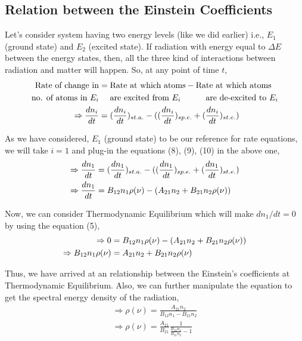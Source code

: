\documentclass[12pt]{article}
\begin{document}
\subsection{Relation between the Einstein Coefficients}

Let's consider system having two energy levels (like we did earlier) i.e., $E_{1}$ (ground state) and $E_{2}$ (excited state). If radiation with energy equal to $\Delta E$ between the energy states, then, all the three kind of interactions between radiation and matter will happen. So, at any point of time $t$,
\begin{align}
    \text{Rate of change in} & = \text{Rate at which atoms} - \text{Rate at which atoms} \notag \\
    \text{no. of atoms in } E_{i} & \quad \text{ are excited from } E_{i} \quad \qquad \text{are de-excited to } E_{i} \notag \\
    \Rightarrow \frac{dn_{i}}{dt} & = (\frac{dn_{i}}{dt})_{st.a.} - ((\frac{dn_{i}}{dt})_{sp.e.} + (\frac{dn_{i}}{dt})_{st.e.}) \notag
\end{align}

As we have considered, $E_{1}$ (ground state) to be our reference for rate equations, we will take $i = 1$ and plug-in the equations (8), (9), (10) in the above one,
\begin{align}
    \Rightarrow \frac{dn_{1}}{dt} & = (\frac{dn_{1}}{dt})_{st.a.} - ((\frac{dn_{1}}{dt})_{sp.e.} + (\frac{dn_{1}}{dt})_{st.e.}) \notag \\
    \Rightarrow \frac{dn_{1}}{dt} & = B_{12}n_{1}\rho(\nu) - (A_{21}n_{2} + B_{21}n_{2}\rho(\nu))
\end{align}

Now, we can consider Thermodynamic Equilibrium which will make $dn_{1}/dt = 0$ by using the equation (5), 
\begin{align}
    \Rightarrow 0 & = B_{12}n_{1}\rho(\nu) - (A_{21}n_{2} + B_{21}n_{2}\rho(\nu)) \notag \\
    \Rightarrow B_{12}n_{1}\rho(\nu) & = A_{21}n_{2} + B_{21}n_{2}\rho(\nu)
\end{align}

Thus, we have arrived at an relationship between the Einstein's coefficients at Thermodynamic Equilibrium. 
Also, we can further manipulate the equation to get the spectral energy density of the radiation,
\begin{align*}
    \Rightarrow \rho(\nu) = \frac{A_{21}n_{2}}{B_{12}n_{1} - B_{21}n_{2}} \\
    \Rightarrow \rho(\nu) = \frac{A_{21}}{B_{21}} \frac{1}{\frac{B_{12}n_{1}}{B_{21}n_{2}} - 1}
\end{align*}
\end{document}
